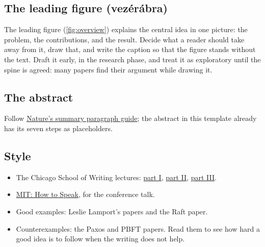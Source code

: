 \subsection{The leading figure (vezérábra)}\label{app:writing:figure}
The leading figure (\cref{fig:overview}) explains the central idea in one picture: the problem, the contributions, and the result. Decide what a reader should take away from it, draw that, and write the caption so that the figure stands without the text. Draft it early, in the research phase, and treat it as exploratory until the spine is agreed: many papers find their argument while drawing it.

\subsection{The abstract}
Follow \href{https://www.nature.com/documents/nature-summary-paragraph.pdf}{Nature's summary paragraph guide}; the abstract in this template already has its seven steps as placeholders.

\subsection{Style}
\begin{itemize}
  \item The Chicago School of Writing lectures: \href{https://www.youtube.com/watch?v=vtIzMaLkCaM}{part I}, \href{https://www.youtube.com/watch?v=aFwVf5a3pZM}{part II}, \href{https://www.youtube.com/watch?v=gphdfSwYMWU}{part III}.
  \item \href{https://www.youtube.com/watch?v=Unzc731iCUY}{MIT: How to Speak}, for the conference talk.
  \item Good examples: Leslie Lamport's papers and the Raft paper.
  \item Counterexamples: the Paxos and PBFT papers. Read them to see how hard a good idea is to follow when the writing does not help.
\end{itemize}

